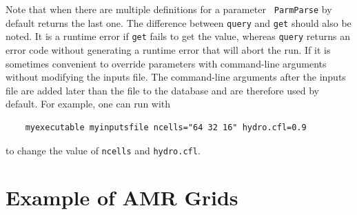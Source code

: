 Note that when there are multiple definitions for a parameter {\tt
  ParmParse} by default returns the last one.  The difference between
{\tt query} and {\tt get} should also be noted.  It is a runtime error
if {\tt get} fails to get the value, whereas {\tt query} returns an
error code without generating a runtime error that will abort the run.
If it is sometimes convenient to override parameters with command-line
arguments without modifying the inputs file.  The command-line
arguments after the inputs file are added later than the file to the
database and are therefore used by default.  For example, one can run
with
\begin{verbatim}
    myexecutable myinputsfile ncells="64 32 16" hydro.cfl=0.9
\end{verbatim}
to change the value of {\tt ncells} and {\tt hydro.cfl}.

\section{Example of AMR Grids}
\label{sec:basics:amrgrids}

